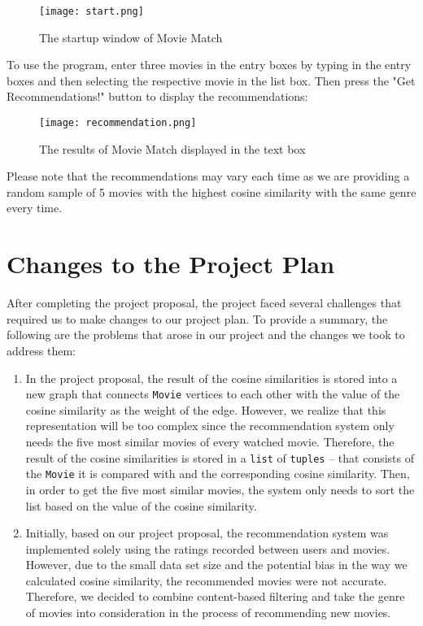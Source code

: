 \documentclass[fontsize=11pt]{article}
\begin{document}
\begin{figure}[h]
    \centering
    \texttt{[image: start.png]}
    \caption{The startup window of Movie Match}
\end{figure}

\quad To use the program, enter three movies in the entry boxes by typing in the entry boxes and then selecting the respective movie in the list box. Then press the "Get Recommendations!" button to display the recommendations:

\begin{figure}[h]
    \centering
    \texttt{[image: recommendation.png]}
    \caption{The results of Movie Match displayed in the text box}

\end{figure}

Please note that the recommendations may vary each time as we are providing a random sample of 5 movies with the highest cosine similarity with the same genre every time. 

\section*{Changes to the Project Plan} 
\quad After completing the project proposal, the project faced several challenges that required us to make changes to our project plan. To provide a summary, the following are the problems that arose in our project and the changes we took to address them:

\begin{enumerate}
    \item In the project proposal, the result of the cosine similarities is stored into a new graph that connects \texttt{Movie} vertices to each other with the value of the cosine similarity as the weight of the edge. However, we realize that this representation will be too complex since the recommendation system only needs the five most similar movies of every watched movie. Therefore, the result of the cosine similarities is stored in a \texttt{list} of \texttt{tuples} – that consists of the \texttt{Movie} it is compared with and the corresponding cosine similarity. Then, in order to get the five most similar movies, the system only needs to sort the list based on the value of the cosine similarity. 
    \item Initially, based on our project proposal, the recommendation system was implemented solely using the ratings recorded between users and movies. However, due to the small data set size and the potential bias in the way we calculated cosine similarity, the recommended movies were not accurate. Therefore, we decided to combine content-based filtering and take the genre of movies into consideration in the process of recommending new movies. 

\end{enumerate}
\end{document}
